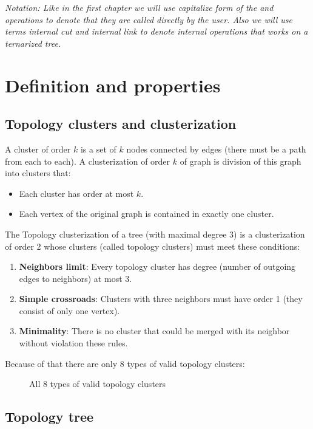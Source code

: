{\it Notation: Like in the first chapter we will use capitalize form of the
\Cut{} and \Link{} operations to denote that they are called directly by the
user. Also we will use terms {\sl internal cut} and {\sl internal link} to
denote internal operations that works on a ternarized tree.}

\section{Definition and properties}

\subsection{Topology clusters and clusterization}

A {\I cluster of order $k$} is a set of $k$ nodes connected by edges (there must
be a path from each to each). A {\I clusterization of order $k$} of graph is
division of this graph into clusters that:
\begin{itemize}
\item Each cluster has order at most $k$.
\item Each vertex of the original graph is contained in exactly one cluster.
\end{itemize}

The {\I Topology clusterization} of a tree (with maximal degree 3) is a clusterization
of order 2 whose clusters (called {\I topology clusters}) must meet these conditions:
\begin{enumerate}
\item {\bf Neighbors limit}: Every topology cluster has degree (number of
outgoing edges to neighbors) at most 3.
\item {\bf Simple crossroads}: Clusters with three neighbors must have order 1
(they consist of only one vertex).
\item {\bf Minimality}: There is no cluster that could be merged with its neighbor
without violation these rules.
\end{enumerate}

Because of that there are only 8 types of valid topology clusters:

\begin{figure}[H]
\centering
{}
\caption{All 8 types of valid topology clusters}
\end{figure}

\subsection{Topology tree}


